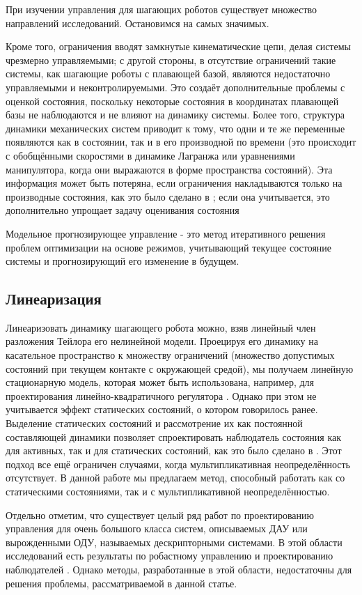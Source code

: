 При изучении управления для шагающих роботов существует множество направлений исследований. Остановимся на самых значимых.

Кроме того, ограничения вводят замкнутые кинематические цепи, делая системы чрезмерно управляемыми; с другой стороны, в отсутствие ограничений такие системы, как шагающие роботы с плавающей базой, являются недостаточно управляемыми и неконтролируемыми. Это создаёт дополнительные проблемы с оценкой состояния, поскольку некоторые состояния в координатах плавающей базы не наблюдаются и не влияют на динамику системы. Более того, структура динамики механических систем приводит к тому, что одни и те же переменные появляются как в состоянии, так и в его производной по времени (это происходит с обобщёнными скоростями в динамике Лагранжа или уравнениями манипулятора, когда они выражаются в форме пространства состояний). Эта информация может быть потеряна, если ограничения накладываются только на производные состояния, как это было сделано в \cite{Mason2017}; если она учитывается, это дополнительно упрощает задачу оценивания состояния

Модельное прогнозирующее управление - это метод итеративного решения проблем оптимизации на основе режимов, учитывающий текущее состояние системы и прогнозирующий его изменение в будущем.

\subsection{Линеаризация}\label{sec:ch1/sec2/sub5}
Линеаризовать динамику шагающего робота можно, взяв линейный член разложения Тейлора его нелинейной модели. Проецируя его динамику на касательное пространство к множеству ограничений (множество допустимых состояний при текущем контакте с окружающей средой), мы получаем линейную стационарную модель, которая может быть использована, например, для проектирования линейно-квадратичного регулятора \cite{mason2014full}. Однако при этом не учитывается эффект статических состояний, о котором говорилось ранее. Выделение статических состояний и рассмотрение их как постоянной составляющей динамики позволяет спроектировать наблюдатель состояния как для активных, так и для статических состояний, как это было сделано в \cite{SAVIN2021}. Этот подход все ещё ограничен случаями, когда мультипликативная неопределённость отсутствует. В данной работе мы предлагаем метод, способный работать как со статическими состояниями, так и с мультипликативной неопределённостью.

Отдельно отметим, что существует целый ряд работ по проектированию управления для очень большого класса систем, описываемых ДАУ или вырожденными ОДУ, называемых дескрипторными системами. В этой области исследований есть результаты по робастному управлению и проектированию наблюдателей \cite{Cheng2018, Darouach2014}. Однако методы, разработанные в этой области, недостаточны для решения проблемы, рассматриваемой в данной статье.

